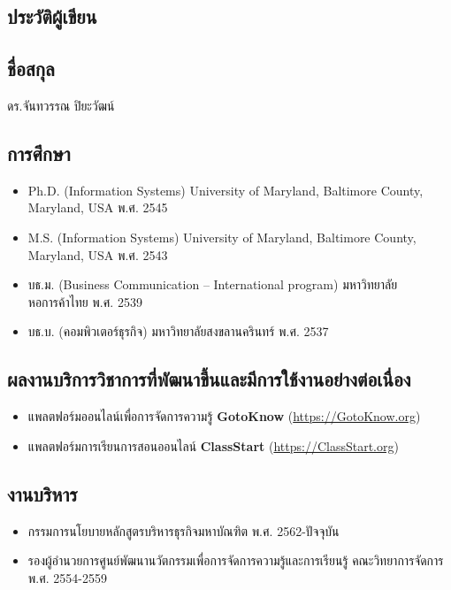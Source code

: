 \begin{appendices}

\chapter{ประวัติผู้เขียน}

\section*{ชื่อสกุล}

ดร.จันทวรรณ ปิยะวัฒน์

\section*{การศึกษา}

\begin{itemize}
	\item Ph.D. (Information Systems) University of Maryland, Baltimore County, Maryland, USA พ.ศ. 2545
	\item M.S. (Information Systems) University of Maryland, Baltimore County, Maryland, USA พ.ศ. 2543
	\item บธ.ม. (Business Communication – International program) มหาวิทยาลัยหอการค้าไทย พ.ศ. 2539
	\item บธ.บ. (คอมพิวเตอร์ธุรกิจ) มหาวิทยาลัยสงขลานครินทร์ พ.ศ. 2537
\end{itemize}

\section*{ผลงานบริการวิชาการที่พัฒนาขึ้นและมีการใช้งานอย่างต่อเนื่อง}

\begin{itemize}
	\item แพลตฟอร์มออนไลน์เพื่อการจัดการความรู้ \textbf{GotoKnow} (\url{https://GotoKnow.org})
	\item แพลตฟอร์มการเรียนการสอนออนไลน์ \textbf{ClassStart} (\url{https://ClassStart.org})
\end{itemize}

\section*{งานบริหาร}

\begin{itemize}
	\item กรรมการนโยบายหลักสูตรบริหารธุรกิจมหาบัณฑิต พ.ศ. 2562-ปัจจุบัน 
	\item รองผู้อำนวยการศูนย์พัฒนานวัตกรรมเพื่อการจัดการความรู้และการเรียนรู้ คณะวิทยาการจัดการ  พ.ศ. 2554-2559 
\end{itemize}


\end{appendices}
